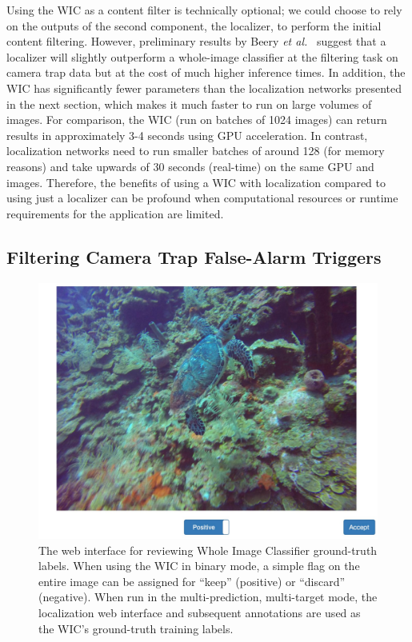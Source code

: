 Using the WIC as a content filter is technically optional; we could choose to rely on the outputs of the second component, the localizer, to perform the initial content filtering. However, preliminary results by Beery \textit{et al.}~\cite{beery_recognition_2018} suggest that a localizer will slightly outperform a whole-image classifier at the filtering task on camera trap data but at the cost of much higher inference times. In addition, the WIC has significantly fewer parameters than the localization networks presented in the next section, which makes it much faster to run on large volumes of images.  For comparison, the WIC (run on batches of 1024 images) can return results in approximately 3-4 seconds using GPU acceleration.  In contrast, localization networks need to run smaller batches of around 128 (for memory reasons) and take upwards of 30 seconds (real-time) on the same GPU and images.  Therefore, the benefits of using a WIC with localization compared to using just a localizer can be profound when computational resources or runtime requirements for the application are limited.

\subsection{Filtering Camera Trap False-Alarm Triggers}

\begin{figure}[!t]
    \begin{center}
        \includegraphics[width=0.8\linewidth]{resources/wic-interface.pdf}
    \end{center}
    \caption{The web interface for reviewing Whole Image Classifier ground-truth labels.  When using the WIC in binary mode, a simple flag on the entire image can be assigned for ``keep'' (positive) or ``discard'' (negative).  When run in the multi-prediction, multi-target mode, the localization web interface and subsequent annotations are used as the WIC's ground-truth training labels.}
    \label{fig:interface-wic}
\end{figure}

